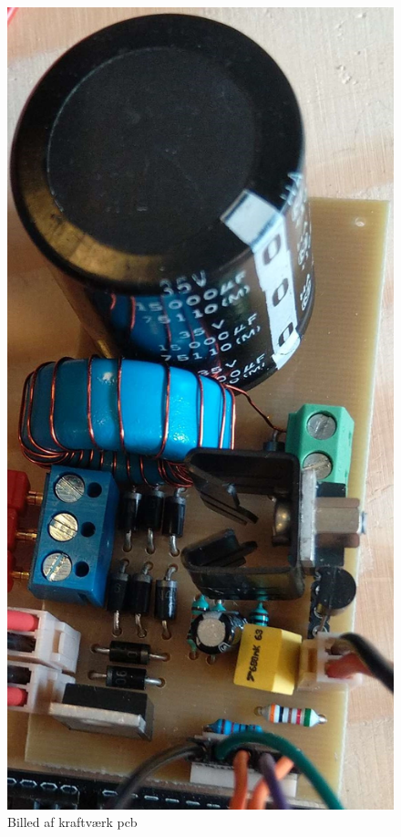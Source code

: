 \documentclass[../main.tex]{subfiles}
\begin{document}
\begin{figure}[H]
      \includegraphics[width=\textwidth]{Dokumentation/Pictures/PCB_kraft.jpg}
     \caption{Billed af kraftværk pcb}
     \label{fig: Kraftverk_pcb}
     \end{figure}
\end{document}
